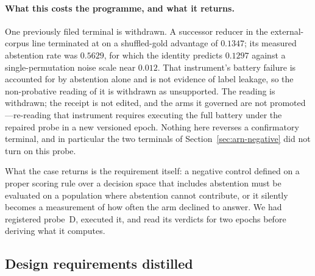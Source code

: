 \paragraph{What this costs the programme, and what it returns.} One previously filed terminal is withdrawn. A successor reducer in the external-corpus line terminated at  on a shuffled-gold advantage of $0.1347$; its measured abstention rate was $0.5629$, for which the identity predicts $0.1297$ against a single-permutation noise scale near $0.012$. That instrument's battery failure is accounted for by abstention alone and is not evidence of label leakage, so the non-probative reading of it is withdrawn as unsupported. The reading is withdrawn; the receipt is not edited, and the arms it governed are not promoted---re-reading that instrument requires executing the full battery under the repaired probe in a new versioned epoch. Nothing here reverses a confirmatory terminal, and in particular the two  terminals of Section~\ref{sec:arn-negative} did not turn on this probe.

What the case returns is the requirement itself: a negative control defined on a proper scoring rule over a decision space that includes abstention must be evaluated on a population where abstention cannot contribute, or it silently becomes a measurement of how often the arm declined to answer. We had registered probe~D, executed it, and read its verdicts for two epochs before deriving what it computes.

\subsection{Design requirements distilled}
\label{sec:design-requirements}


